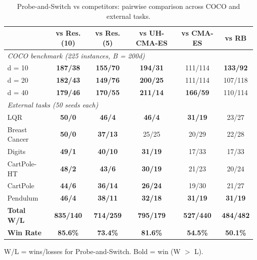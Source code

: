\documentclass[11pt]{article}
\begin{document}
\begin{table}[t]
\centering
\caption{Probe-and-Switch vs competitors: pairwise comparison across COCO and external tasks.}
\label{tab:probeswitch_comparison}
\small
\begin{tabular}{l c c c c c}
\toprule
                    & vs Res.(10) & vs Res.(5) & vs UH-CMA-ES & vs CMA-ES & vs RB \\
\midrule
\multicolumn{6}{l}{\textit{COCO benchmark (225 instances, B = 200d)}} \\
\quad d = 10        & \textbf{187/38} & \textbf{155/70} & \textbf{194/31} & 111/114 & \textbf{133/92} \\
\quad d = 20        & \textbf{182/43} & \textbf{149/76} & \textbf{200/25} & 111/114 & 107/118 \\
\quad d = 40        & \textbf{179/46} & \textbf{170/55} & \textbf{211/14} & \textbf{166/59} & 110/114 \\
\midrule
\multicolumn{6}{l}{\textit{External tasks (50 seeds each)}} \\
\quad LQR           & \textbf{50/0} & \textbf{46/4} & \textbf{46/4} & \textbf{31/19} & 23/27 \\
\quad Breast Cancer & \textbf{50/0} & \textbf{37/13} & 25/25 & 20/29 & 22/28 \\
\quad Digits        & \textbf{49/1} & \textbf{40/10} & \textbf{31/19} & 17/33 & 17/33 \\
\quad CartPole-HT   & \textbf{48/2} & \textbf{43/6} & \textbf{30/19} & 21/23 & 20/24 \\
\quad CartPole      & \textbf{44/6} & \textbf{36/14} & \textbf{26/24} & 19/30 & 21/27 \\
\quad Pendulum      & \textbf{46/4} & \textbf{38/11} & \textbf{32/18} & \textbf{31/19} & \textbf{31/19} \\
\midrule
\textbf{Total W/L}  & \textbf{835/140} & \textbf{714/259} & \textbf{795/179} & \textbf{527/440} & \textbf{484/482} \\
\textbf{Win Rate}   & \textbf{85.6\%} & \textbf{73.4\%} & \textbf{81.6\%} & \textbf{54.5\%} & \textbf{50.1\%} \\
\bottomrule
\end{tabular}
\vspace{1mm}
\begin{minipage}{\linewidth}
\footnotesize
W/L = wins/losses for Probe-and-Switch. Bold = win (W $>$ L).
\end{minipage}
\end{table}
\end{document}

